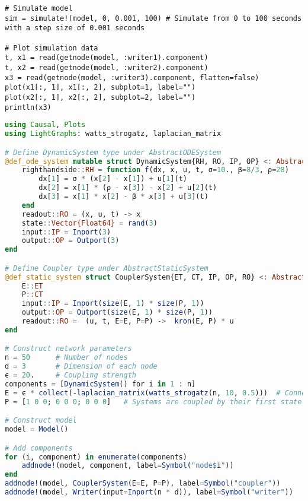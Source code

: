 \begin{lstlisting}
# Simulate model 
sim = simulate!(model, 0, 0.001, 100) # Simulate from 0 to 100 seconds with a step size of 0.001 seconds

# Plot simulation data 
t, x1 = read(getnode(model, :writer1).component)
t, x2 = read(getnode(model, :writer2).component)
x3 = read(getnode(model, :writer3).component, flatten=false)
plot(x1[:, 1], x1[:, 2], subplot=1, label="")
plot(x2[:, 1], x2[:, 2], subplot=2, label="")   
println(x3)  
\end{lstlisting}

\begin{lstlisting}[caption={Program using Causal.jl for the simulation of the system in Figure \ref{fig: network graph}. Plots.jl is used to plot the simulation data while LightGraphs.jl is used to construct the connectiviy matrix of the network topology \cite{plots, lightgraphs}}, label={lst: network codes}, language=Julia]
using Causal, Plots
using LightGraphs: watts_strogatz, laplacian_matrix

# Define DynamicSystem type under AbstractODESystem
@def_ode_system mutable struct DynamicSystem{RH, RO, IP, OP} <: AbstractODESystem
    righthandside::RH = function f(dx, x, u, t, σ=10., β=8/3, ρ=28)
        dx[1] = σ * (x[2] - x[1]) + u[1](t)
        dx[2] = x[1] * (ρ - x[3]) - x[2] + u[2](t)
        dx[3] = x[1] * x[2] - β * x[3] + u[3](t)
    end
    readout::RO = (x, u, t) -> x
    state::Vector{Float64} = rand(3)
    input::IP = Inport(3)
    output::OP = Outport(3) 
end  

# Define Coupler type under AbstractStaticSystem
@def_static_system struct CouplerSystem{ET, CT, IP, OP, RO} <: AbstractStaticSystem
    E::ET
    P::CT
    input::IP = Inport(size(E, 1) * size(P, 1))
    output::OP = Outport(size(E, 1) * size(P, 1))
    readout::RO =  (u, t, E=E, P=P) ->  kron(E, P) * u
end

# Construct network parameters 
n = 50      # Number of nodes 
d = 3       # Dimension of each node
ϵ = 20.     # Coupling strength 
components = [DynamicSystem() for i in 1 : n]
E = ϵ * collect(-laplacian_matrix(watts_strogatz(n, 10, 0.5)))  # Connectivity matrix of network topology
P = [1 0 0; 0 0 0; 0 0 0]   # Systems are coupled by their first state variable.

# Construct model 
model = Model() 

# Add components
for (i, component) in enumerate(components)
    addnode!(model, component, label=Symbol("node$i"))
end
addnode!(model, CouplerSystem(E=E, P=P), label=Symbol("coupler"))
addnode!(model, Writer(input=Inport(n * d)), label=Symbol("writer"))


\end{lstlisting}
